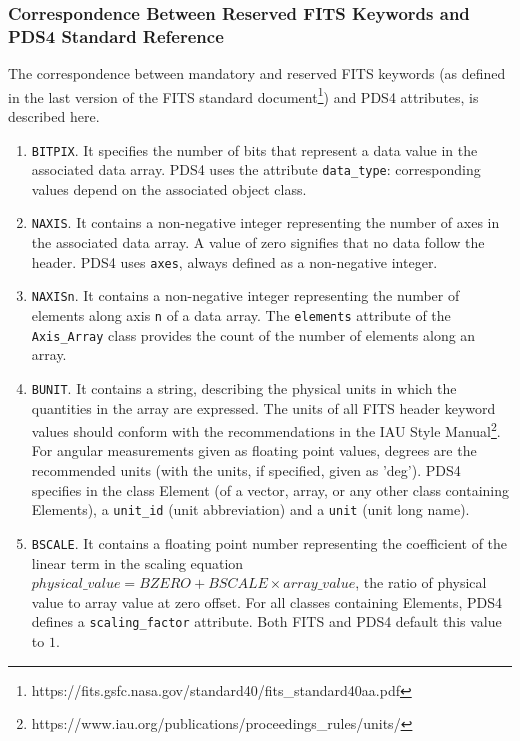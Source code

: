 \subsubsection{Correspondence Between Reserved FITS Keywords and PDS4 Standard Reference}
\label{sssec:stdfitspds4}
The correspondence between mandatory and reserved FITS keywords (as defined in
the last version of the FITS standard document\footnote{https://fits.gsfc.nasa.gov/standard40/fits\_standard40aa.pdf})
and PDS4 attributes, is described here.
\begin{enumerate}
\item{\texttt{BITPIX}.
It specifies the number of bits that represent a data value in
the associated data array.
PDS4 uses the attribute \texttt{data\_type}: corresponding 
values depend on the associated object class.}

\item{\texttt{NAXIS}.
It contains a non-negative integer representing the number of axes in
the associated data array.
A value of zero signifies that no data follow the header.
PDS4 uses \texttt{axes}, always defined as a non-negative integer.}

\item{\texttt{NAXISn}.
It contains a non-negative integer representing the number of
elements along axis \texttt{n} of a data array.
The \texttt{elements} attribute of the  \texttt{Axis\_Array} class provides
the count of the number of elements along an array.}

\item{\texttt{BUNIT}.
It contains a string, describing the physical units in which the quantities
in the array are expressed.
The units of all FITS header keyword values should conform with the recommendations
in the IAU Style Manual\footnote{https://www.iau.org/publications/proceedings\_rules/units/}.
For angular measurements given as floating point values, degrees are the recommended
units (with the units, if specified, given as 'deg').
PDS4 specifies in the class Element (of a vector, array, or any other class
containing Elements), a \texttt{unit\_id}} (unit abbreviation) and a \texttt{unit}
(unit long name).

\item{\texttt{BSCALE}.
It contains a floating point number representing the coefficient of the linear term
in the scaling equation $physical\_value = BZERO + BSCALE \times array\_value$,
the ratio of physical value to array value at zero offset.
For all classes containing Elements, PDS4 defines a \texttt{scaling\_factor}
attribute.
Both FITS and PDS4 default this value to $1$.}


\end{enumerate}
